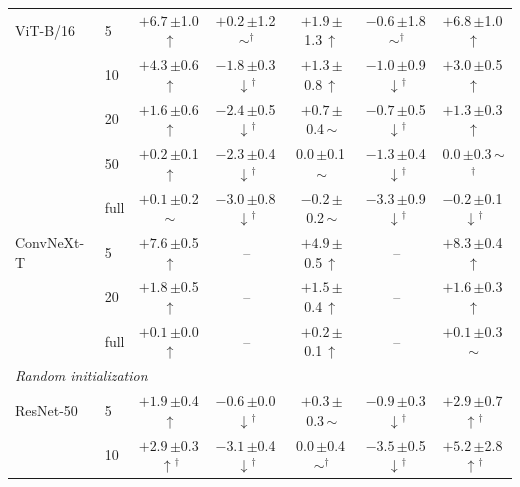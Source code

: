 \begin{table}[htbp]
\begin{tabular}{llccccc}
ViT-B/16 & 5 & $+6.7$\,{\scriptsize$\pm$1.0}\,$\uparrow$ & $+0.2$\,{\scriptsize$\pm$1.2}\,$\sim$$^\dagger$ & $+1.9$\,{\scriptsize$\pm$1.3}\,$\uparrow$ & $-0.6$\,{\scriptsize$\pm$1.8}\,$\sim$$^\dagger$ & $+6.8$\,{\scriptsize$\pm$1.0}\,$\uparrow$ \\
 & 10 & $+4.3$\,{\scriptsize$\pm$0.6}\,$\uparrow$ & $-1.8$\,{\scriptsize$\pm$0.3}\,$\downarrow$$^\dagger$ & $+1.3$\,{\scriptsize$\pm$0.8}\,$\uparrow$ & $-1.0$\,{\scriptsize$\pm$0.9}\,$\downarrow$$^\dagger$ & $+3.0$\,{\scriptsize$\pm$0.5}\,$\uparrow$ \\
 & 20 & $+1.6$\,{\scriptsize$\pm$0.6}\,$\uparrow$ & $-2.4$\,{\scriptsize$\pm$0.5}\,$\downarrow$$^\dagger$ & $+0.7$\,{\scriptsize$\pm$0.4}\,$\sim$ & $-0.7$\,{\scriptsize$\pm$0.5}\,$\downarrow$$^\dagger$ & $+1.3$\,{\scriptsize$\pm$0.3}\,$\uparrow$ \\
 & 50 & $+0.2$\,{\scriptsize$\pm$0.1}\,$\uparrow$ & $-2.3$\,{\scriptsize$\pm$0.4}\,$\downarrow$$^\dagger$ & $0.0$\,{\scriptsize$\pm$0.1}\,$\sim$ & $-1.3$\,{\scriptsize$\pm$0.4}\,$\downarrow$$^\dagger$ & $0.0$\,{\scriptsize$\pm$0.3}\,$\sim$$^\dagger$ \\
 & full & $+0.1$\,{\scriptsize$\pm$0.2}\,$\sim$ & $-3.0$\,{\scriptsize$\pm$0.8}\,$\downarrow$$^\dagger$ & $-0.2$\,{\scriptsize$\pm$0.2}\,$\sim$ & $-3.3$\,{\scriptsize$\pm$0.9}\,$\downarrow$$^\dagger$ & $-0.2$\,{\scriptsize$\pm$0.1}\,$\downarrow$$^\dagger$ \\
\addlinespace[2pt]
ConvNeXt-T & 5 & $+7.6$\,{\scriptsize$\pm$0.5}\,$\uparrow$ & -- & $+4.9$\,{\scriptsize$\pm$0.5}\,$\uparrow$ & -- & $+8.3$\,{\scriptsize$\pm$0.4}\,$\uparrow$ \\
 & 20 & $+1.8$\,{\scriptsize$\pm$0.5}\,$\uparrow$ & -- & $+1.5$\,{\scriptsize$\pm$0.4}\,$\uparrow$ & -- & $+1.6$\,{\scriptsize$\pm$0.3}\,$\uparrow$ \\
 & full & $+0.1$\,{\scriptsize$\pm$0.0}\,$\uparrow$ & -- & $+0.2$\,{\scriptsize$\pm$0.1}\,$\uparrow$ & -- & $+0.1$\,{\scriptsize$\pm$0.3}\,$\sim$ \\
\midrule
\multicolumn{7}{l}{\textit{Random initialization}} \\
ResNet-50 & 5 & $+1.9$\,{\scriptsize$\pm$0.4}\,$\uparrow$ & $-0.6$\,{\scriptsize$\pm$0.0}\,$\downarrow$$^\dagger$ & $+0.3$\,{\scriptsize$\pm$0.3}\,$\sim$ & $-0.9$\,{\scriptsize$\pm$0.3}\,$\downarrow$$^\dagger$ & $+2.9$\,{\scriptsize$\pm$0.7}\,$\uparrow$$^\dagger$ \\
 & 10 & $+2.9$\,{\scriptsize$\pm$0.3}\,$\uparrow$$^\dagger$ & $-3.1$\,{\scriptsize$\pm$0.4}\,$\downarrow$$^\dagger$ & $0.0$\,{\scriptsize$\pm$0.4}\,$\sim$$^\dagger$ & $-3.5$\,{\scriptsize$\pm$0.5}\,$\downarrow$$^\dagger$ & $+5.2$\,{\scriptsize$\pm$2.8}\,$\uparrow$$^\dagger$ \\

\end{tabular}
\end{table}
